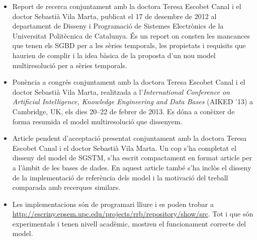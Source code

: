 \begin{itemize}

\item Report de recerca \parencite{llusa12:report} conjuntament amb la
  doctora Teresa Escobet Canal i el doctor Sebastià Vila Marta,
  publicat el 17 de desembre de 2012 al departament de Disseny i
  Programació de Sistemes Electrònics de la Universitat Politècnica de
  Catalunya. És un report on consten les mancances que tenen els
  \gls{SGBD} per a les sèries temporals, les propietats i requisits
  que haurien de complir i la idea bàsica de la proposta d'un nou
  model multiresolució per a sèries temporals.

\item Ponència a congrés \parencite{llusa13:aiked} conjuntament amb la
  doctora Teresa Escobet Canal i el doctor Sebastià Vila Marta, realitzada
  a l'\emph{International Conference on Artificial Intelligence, Knowledge
  Engineering and Data Bases} (AIKED '13) a Cambridge, UK, els dies
  20--22 de febrer de 2013.  Es dóna a conèixer de forma resumida el
  model multiresolució que dissenyem.


\item Article pendent d'acceptació presentat conjuntament amb la
  doctora Teresa Escobet Canal i el doctor Sebastià Vila Marta. Un cop
  s'ha completat el disseny del model de \gls{SGSTM}, s'ha escrit
  compactament en format article per a l'àmbit de les bases de dades.
  En aquest article també s'ha inclòs el disseny de la implementació
  de referència dels model i la motivació del treball comparada amb
  recerques similars.

\item Les implementacions són de programari lliure i es poden trobar a
  \url{http://escriny.epsem.upc.edu/projects/rrb/repository/show/src}. Tot
  i que són experimentals i tenen nivell acadèmic, mostren el
  funcionament correcte del model.

\end{itemize}






